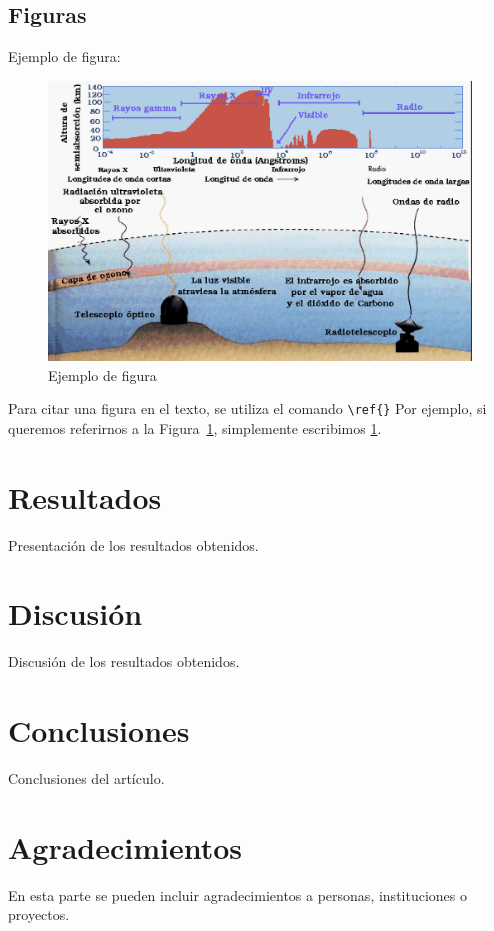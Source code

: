 \documentclass[a4paper,alpha-refs]{eSpectra}
\begin{document}
\subsection{Figuras}

Ejemplo de figura:

\begin{figure}[htb]
    \centering
        \includegraphics[width=1.0\linewidth]{figura1.png}
        \caption{Ejemplo de figura}
        \label{fig:figura1}
\end{figure}
Para citar una figura en el texto, se utiliza el comando \verb|\ref{}|  Por ejemplo, si queremos referirnos a la Figura~\ref{fig:figura1}, simplemente escribimos \ref{fig:figura1}.

\section{Resultados}

Presentación de los resultados obtenidos.

\section{Discusión}

Discusión de los resultados obtenidos.

\section{Conclusiones}

Conclusiones del artículo.

\section*{Agradecimientos}
En esta parte se pueden incluir agradecimientos a personas, instituciones o proyectos.
\end{document}
